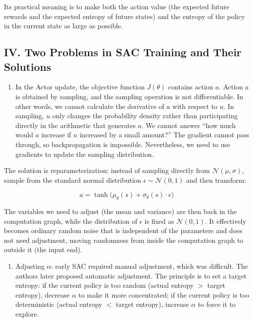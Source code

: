 Its practical meaning is to make both the action value (the expected future rewards and the expected entropy of future states) and the entropy of the policy in the current state as large as possible.

\hypertarget{iv.-two-problems-in-sac-training-and-their-solutions}{%
\subsection{IV. Two Problems in SAC Training and Their Solutions}\label{iv.-two-problems-in-sac-training-and-their-solutions}}

\begin{enumerate}
\def\labelenumi{\arabic{enumi}.}
\tightlist
\item
  In the Actor update, the objective function \(J(\theta)\) contains action \(a\). Action \(a\) is obtained by sampling, and the sampling operation is not differentiable. In other words, we cannot calculate the derivative of \(a\) with respect to \(u\). In sampling, \(u\) only changes the probability density rather than participating directly in the arithmetic that generates \(a\). We cannot answer ``how much would \(a\) increase if \(u\) increased by a small amount?'' The gradient cannot pass through, so backpropagation is impossible. Nevertheless, we need to use gradients to update the sampling distribution.
\end{enumerate}

The solution is reparameterization: instead of sampling directly from \(\mathcal{N}(\mu,\sigma)\), sample from the standard normal distribution \(\epsilon\sim\mathcal{N}(0,1)\) and then transform:

\[
a
=
\tanh\bigl(
\mu_\theta(s)+\sigma_\theta(s)\cdot\epsilon
\bigr)
\]

The variables we need to adjust (the mean and variance) are then back in the computation graph, while the distribution of \(\epsilon\) is fixed as \(\mathcal{N}(0,1)\). It effectively becomes ordinary random noise that is independent of the parameters and does not need adjustment, moving randomness from inside the computation graph to outside it (the input end).

\begin{enumerate}
\def\labelenumi{\arabic{enumi}.}
\setcounter{enumi}{1}
\tightlist
\item
  Adjusting \(\alpha\): early SAC required manual adjustment, which was difficult. The authors later proposed automatic adjustment. The principle is to set a target entropy: if the current policy is too random (actual entropy \(>\) target entropy), decrease \(\alpha\) to make it more concentrated; if the current policy is too deterministic (actual entropy \(<\) target entropy), increase \(\alpha\) to force it to explore.
\end{enumerate}

